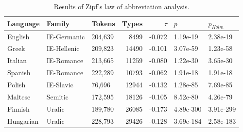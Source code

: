 \begin{table}[!h]
\centering
\caption{Results of Zipf's law of abbreviation analysis.}
\centering
\begin{tabular}[t]{lllrrll}
\toprule
Language & Family & Tokens & Types & $\tau$ & $p$ & $p_{Holm}$\\
\midrule
English & IE-Germanic & 204,639 & 8499 & -0.072 & 1.19e-19 & 2.38e-19\\
Greek & IE-Hellenic & 209,823 & 14490 & -0.101 & 3.07e-59 & 1.23e-58\\
Italian & IE-Romance & 213,665 & 11259 & -0.080 & 1.22e-30 & 3.65e-30\\
Spanish & IE-Romance & 222,289 & 10793 & -0.062 & 1.91e-18 & 1.91e-18\\
Polish & IE-Slavic & 76,696 & 12944 & -0.132 & 1.28e-85 & 7.69e-85\\
\addlinespace
Maltese & Semitic & 172,595 & 18126 & -0.105 & 8.52e-80 & 4.26e-79\\
Finnish & Uralic & 189,780 & 26085 & -0.173 & 4.89e-300 & 3.91e-299\\
Hungarian & Uralic & 228,793 & 29426 & -0.128 & 3.69e-184 & 2.58e-183\\
\bottomrule
\end{tabular}
\end{table}
